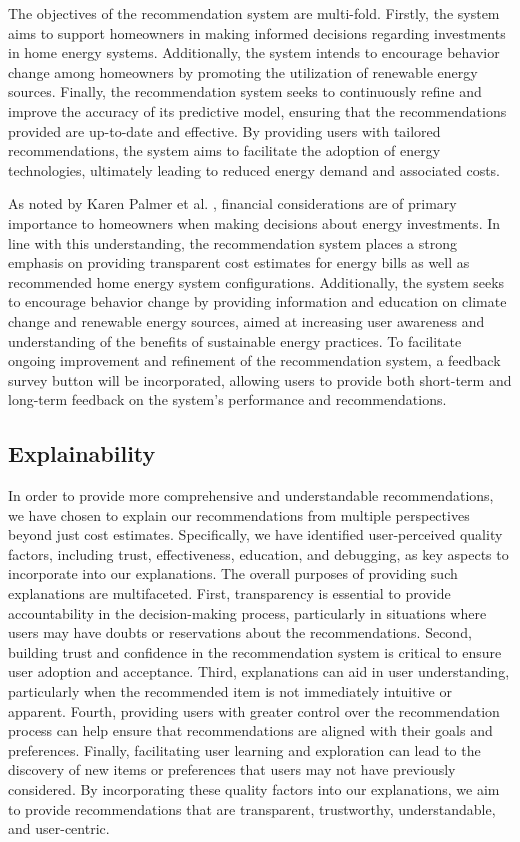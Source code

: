 The objectives of the recommendation system are multi-fold. 
Firstly, the system aims to support homeowners in making informed decisions regarding investments in home energy systems. 
Additionally, the system intends to encourage behavior change among homeowners by promoting the utilization of renewable energy sources. 
Finally, the recommendation system seeks to continuously refine and improve the accuracy of its predictive model, ensuring that the recommendations provided are up-to-date and effective. 
By providing users with tailored recommendations, the system aims to facilitate the adoption of energy technologies, ultimately leading to reduced energy demand and associated costs. 

As noted by Karen Palmer et al. \cite{informationgap}, financial considerations are of primary importance to homeowners when making decisions about energy investments. 
In line with this understanding, the recommendation system places a strong emphasis on providing transparent cost estimates for energy bills as well as recommended home energy system configurations. 
Additionally, the system seeks to encourage behavior change by providing information and education on climate change and renewable energy sources, aimed at increasing user awareness and understanding of the benefits of sustainable energy practices. 
To facilitate ongoing improvement and refinement of the recommendation system, a feedback survey button will be incorporated, allowing users to provide both short-term and long-term feedback on the system's performance and recommendations. 

\subsection{Explainability}

In order to provide more comprehensive and understandable recommendations, we have chosen to explain our recommendations from multiple perspectives beyond just cost estimates. 
Specifically, we have identified user-perceived quality factors, including trust, effectiveness, education, and debugging, as key aspects to incorporate into our explanations. 
The overall purposes of providing such explanations are multifaceted. 
First, transparency is essential to provide accountability in the decision-making process, particularly in situations where users may have doubts or reservations about the recommendations. 
Second, building trust and confidence in the recommendation system is critical to ensure user adoption and acceptance. 
Third, explanations can aid in user understanding, particularly when the recommended item is not immediately intuitive or apparent. 
Fourth, providing users with greater control over the recommendation process can help ensure that recommendations are aligned with their goals and preferences. 
Finally, facilitating user learning and exploration can lead to the discovery of new items or preferences that users may not have previously considered. 
By incorporating these quality factors into our explanations, we aim to provide recommendations that are transparent, trustworthy, understandable, and user-centric. 

